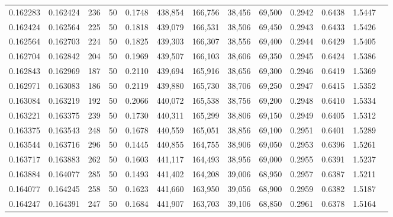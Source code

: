 \begin{tabular}{rrrrrrrrrrrrr}
0.162283 & 0.162424 &   236 &  50 &                                     0.1748 & 438,854 & 166,756 &  38,456 &  69,500 & 0.2942 & 0.6438 & 1.5447 \\
0.162424 & 0.162564 &   225 &  50 &                                     0.1818 & 439,079 & 166,531 &  38,506 &  69,450 & 0.2943 & 0.6433 & 1.5426 \\
0.162564 & 0.162703 &   224 &  50 &                                     0.1825 & 439,303 & 166,307 &  38,556 &  69,400 & 0.2944 & 0.6429 & 1.5405 \\
0.162704 & 0.162842 &   204 &  50 &                                     0.1969 & 439,507 & 166,103 &  38,606 &  69,350 & 0.2945 & 0.6424 & 1.5386 \\
0.162843 & 0.162969 &   187 &  50 &                                     0.2110 & 439,694 & 165,916 &  38,656 &  69,300 & 0.2946 & 0.6419 & 1.5369 \\
0.162971 & 0.163083 &   186 &  50 &                                     0.2119 & 439,880 & 165,730 &  38,706 &  69,250 & 0.2947 & 0.6415 & 1.5352 \\
0.163084 & 0.163219 &   192 &  50 &                                     0.2066 & 440,072 & 165,538 &  38,756 &  69,200 & 0.2948 & 0.6410 & 1.5334 \\
0.163221 & 0.163375 &   239 &  50 &                                     0.1730 & 440,311 & 165,299 &  38,806 &  69,150 & 0.2949 & 0.6405 & 1.5312 \\
0.163375 & 0.163543 &   248 &  50 &                                     0.1678 & 440,559 & 165,051 &  38,856 &  69,100 & 0.2951 & 0.6401 & 1.5289 \\
0.163544 & 0.163716 &   296 &  50 &                                     0.1445 & 440,855 & 164,755 &  38,906 &  69,050 & 0.2953 & 0.6396 & 1.5261 \\
0.163717 & 0.163883 &   262 &  50 &                                     0.1603 & 441,117 & 164,493 &  38,956 &  69,000 & 0.2955 & 0.6391 & 1.5237 \\
0.163884 & 0.164077 &   285 &  50 &                                     0.1493 & 441,402 & 164,208 &  39,006 &  68,950 & 0.2957 & 0.6387 & 1.5211 \\
0.164077 & 0.164245 &   258 &  50 &                                     0.1623 & 441,660 & 163,950 &  39,056 &  68,900 & 0.2959 & 0.6382 & 1.5187 \\
0.164247 & 0.164391 &   247 &  50 &                                     0.1684 & 441,907 & 163,703 &  39,106 &  68,850 & 0.2961 & 0.6378 & 1.5164 \\

\end{tabular}
